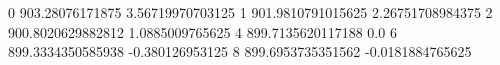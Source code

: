 0 903.28076171875 3.56719970703125
1 901.9810791015625 2.26751708984375
2 900.8020629882812 1.0885009765625
4 899.7135620117188 0.0
6 899.3334350585938 -0.380126953125
8 899.6953735351562 -0.0181884765625
